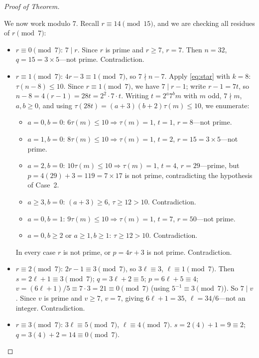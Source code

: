 \documentclass[11pt]{article}
\begin{document}
\begin{proof}[Proof of Theorem]
\begin{itemize}
\begin{itemize}
    We now work modulo $7$.  Recall $r \equiv 14 \pmod{15}$, and we are
    checking all residues of $r \pmod 7$:
    \begin{itemize}
    \item $r \equiv 0 \pmod 7$: $7 \mid r$.  Since $r$ is prime and $r \ge 7$,
      $r = 7$.  Then $n = 32$, $q = 15 = 3 \times 5$---not prime.
      Contradiction.
    \item $r \equiv 1 \pmod 7$: $4r - 3 \equiv 1 \pmod 7$, so $7 \nmid n - 7$.
      Apply \eqref{eq:star} with $k = 8$: $\tau(n-8) \le 10$.
      Since $r \equiv 1 \pmod 7$, we have $7 \mid r - 1$; write $r - 1 = 7t$,
      so $n - 8 = 4(r-1) = 28t = 2^2 \cdot 7 \cdot t$.
      Writing $t = 2^a 7^b m$ with $m$ odd, $7 \nmid m$, $a, b \ge 0$,
      and using $\tau(28t) = (a+3)(b+2)\tau(m) \le 10$, we enumerate:
      \begin{itemize}
      \item $a=0, b=0$: $6\tau(m) \le 10 \Rightarrow \tau(m)=1$,
        $t=1$, $r=8$---not prime.
      \item $a=1, b=0$: $8\tau(m) \le 10 \Rightarrow \tau(m)=1$,
        $t=2$, $r=15=3\times5$---not prime.
      \item $a=2, b=0$: $10\tau(m) \le 10 \Rightarrow \tau(m)=1$,
        $t=4$, $r=29$---prime, but $p = 4(29)+3 = 119 = 7\times17$
        is not prime, contradicting the hypothesis of Case~2.
      \item $a\ge3, b=0$: $(a+3) \ge 6$, $\tau \ge 12 > 10$.  Contradiction.
      \item $a=0, b=1$: $9\tau(m) \le 10 \Rightarrow \tau(m)=1$,
        $t=7$, $r=50$---not prime.
      \item $a=0, b\ge2$ or $a\ge1, b\ge1$: $\tau \ge 12 > 10$.  Contradiction.
      \end{itemize}
      In every case $r$ is not prime, or $p=4r+3$ is not prime.
      Contradiction.
    \item $r \equiv 2 \pmod 7$: $2r - 1 \equiv 3 \pmod 7$, so
      $3\ell \equiv 3$, $\ell \equiv 1 \pmod 7$.  Then
      $s = 2\ell + 1 \equiv 3 \pmod 7$; $q = 3\ell + 2 \equiv 5$;
      $p = 6\ell + 5 \equiv 4$; $v = (6\ell+1)/5 \equiv 7 \cdot 3 = 21
      \equiv 0 \pmod 7$ (using $5^{-1} \equiv 3 \pmod 7$).
      So $7 \mid v$.  Since $v$ is prime and $v \ge 7$, $v = 7$, giving
      $6\ell + 1 = 35$, $\ell = 34/6$---not an integer.  Contradiction.
    \item $r \equiv 3 \pmod 7$: $3\ell \equiv 5 \pmod 7$,
      $\ell \equiv 4 \pmod 7$.
      $s = 2(4) + 1 = 9 \equiv 2$; $q = 3(4)+2=14\equiv 0 \pmod 7$.

\end{itemize}
\end{itemize}
\end{itemize}
\end{proof}
\end{document}
